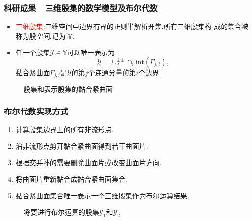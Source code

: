\documentclass[UTF8]{ctexbeamer}	%
\theoremstyle{plain}
\theoremstyle{definition}
\theoremstyle{remark}
\numberwithin{equation}{section}
\begin{document}
\begin{frame}
    \frametitle{科研成果---三维殷集的数学模型及布尔代数}
    \begin{itemize}
        \item \textcolor{red}{三维殷集}:三维空间中边界有界的正则半解析开集.所有三维殷集构
              成的集合被称为殷空间,记为 $\mathbb{Y}$.
        \item 任一个殷集$\mathcal{Y} \in \mathbb{Y}$可以唯一表示为
              \[\mathcal{Y} = \cup_j^{\bot \bot} \cap_i \text{int}(\Gamma_{j, i}),\]
              黏合紧曲面$\Gamma_{j, i}$是$\mathcal{Y}$的第$j$个连通分量的第$i$个边界.
    \end{itemize}
    \begin{figure}[!htb]
        \centering
         \qquad
        \caption{殷集和表示殷集的黏合紧曲面}
    \end{figure}
\end{frame}

\begin{frame}
    \frametitle{布尔代数实现方式}
    \begin{enumerate}
        \item 计算殷集边界上的所有非流形点.
        \item 沿非流形点剪开黏合紧曲面得到若干曲面片.
        \item 根据交并补的需要删除曲面片或改变曲面片方向.
        \item 将曲面片重新黏合成黏合紧曲面集合.
        \item 黏合紧曲面集合唯一表示一个三维殷集作为布尔运算结果.
    \end{enumerate}
    \begin{figure}[!htb]
        \centering
         \qquad
        \caption{将要进行布尔运算的殷集$\mathcal{Y}_1$和$\mathcal{Y}_2$}
    \end{figure}
\end{frame}
\end{document}
